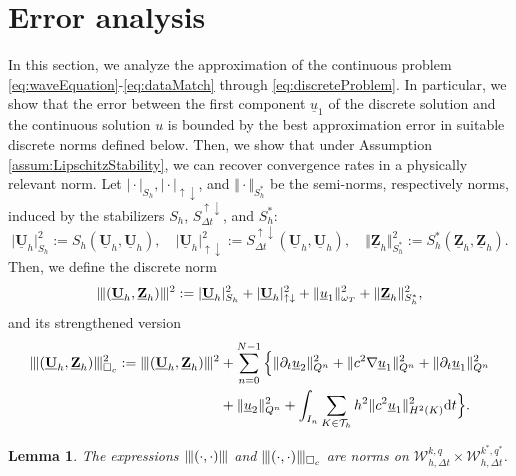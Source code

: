 \documentclass[sn-mathphys-num]{sn-jnl}
\newtheorem{lem}[thm]{Lemma}
\numberwithin{equation}{section}
\newcommand{\wop}{\square_c}
\newcommand{\tnorm}[1]{\vert\hspace{-0.3mm}\Vert#1\Vert\hspace{-0.3mm}\vert}
\newcommand{\dT}{\mathrm{d}t}
\newcommand{\ProdFullyDiscrSpace}[2]{ \mathcal{W}^{ {#1},{#2}}_{h, \Delta t  } }
\newcommand{\Uh}{\underline{\mathbf{U}}_h}
\newcommand{\Zh}{\underline{\mathbf{Z}}_h}
\newcommand{\ul}{\underline{u}}
\newcommand{\Sud}{S^{\uparrow \downarrow}_{\Delta t}}
\newcommand{\dt}{\partial_t}
\begin{document}
\section{Error analysis}
\noindent In this section, we analyze the approximation of the continuous problem \eqref{eq:waveEquation}-\eqref{eq:dataMatch} through \eqref{eq:discreteProblem}. In particular, we show that the error between the first component $\ul_1$ of the discrete solution and the continuous solution $u$ is bounded by the best approximation error in suitable discrete norms defined below. Then, we show that under Assumption \ref{assum:LipschitzStability}, we can recover convergence rates in a physically relevant norm.
Let $\vert \cdot \vert_{S_h}, \vert \cdot \vert_{\uparrow \downarrow}$, and $\Vert \cdot \Vert_{S_h^{\ast}}$ be the semi-norms, respectively norms, induced by the stabilizers $S_h$, $\Sud$, and $S_h^{\ast}$:
\begin{equation}
    \vert \Uh \vert^2_{S_h} := S_h(\Uh,\Uh), \quad \vert \Uh \vert^2_{\uparrow \downarrow} := \Sud(\Uh,\Uh), \quad \Vert \Zh \Vert^2_{S_h^{\ast}} := S_h^{\ast}(\Zh,\Zh).
\end{equation}
\noindent Then, we define the discrete norm 
\begin{equation}
    \tnorm{ (\Uh,\Zh) }^2 :=  \vert \Uh \vert^2_{S_h} + \vert \Uh \vert^2_{\uparrow \downarrow} + \Vert \ul_1 \Vert^2_{\omega_T} + \Vert \Zh \Vert^2_{S_h^\ast},
\end{equation}
and its strengthened version
\begin{equation}\label{eq:tnormwop}
    \begin{aligned}
        \tnorm{(\Uh, \Zh)}^2_{\wop} := \tnorm{(\Uh, \Zh)}^2 &+ \sum_{n = 0}^{N -1} \Big\{ \Vert \dt \ul_2 \Vert^2_{Q^n} + \Vert c^2 \nabla \ul_1 \Vert^2_{Q^n} + \Vert \dt \ul_1 \Vert^2_{Q^n} \\
        &+ \Vert \ul_2 \Vert^2_{Q^n} + \int_{I_n} \sum_{K \in \mathcal{T}_h} h^2 \Vert c^2 \ul_1 \Vert^2_{H^2(K)} \dT \Big\}. 
    \end{aligned}
\end{equation}

\begin{lem}
    The expressions $\tnorm{(\cdot,\cdot)}$ and $\tnorm{(\cdot,\cdot)}_{\wop}$ are norms on $\ProdFullyDiscrSpace{k}{q} \times \ProdFullyDiscrSpace{k^\ast}{q^\ast}$.  
\end{lem}
\end{document}
